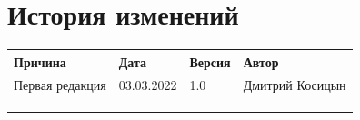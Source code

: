 \newpage


\section*{История изменений}
\noindent

\scriptsize
\begin{longtable}{|p{40mm}|p{20mm}|p{20mm}|p{60mm}|}
\hline
{\bf \parbox[c][5mm]{40mm}{\centering Причина}} & {\bf \parbox[c]{19mm}{\centering Дата}} & {\bf \parbox[c]{16mm}{\centering Версия}} & {\bf \parbox[c]{25mm}{\centering Автор}} \\
\hline
\parbox[c][9mm]{40mm}{Первая редакция} & \parbox{19mm}{03.03.2022} & \parbox{16mm}{1.0} & \parbox{60mm}{Дмитрий Косицын} \\

\hline
&&&\\
\hline
&&&\\
\hline
&&&\\
\hline
\end{longtable}  
\normalsize